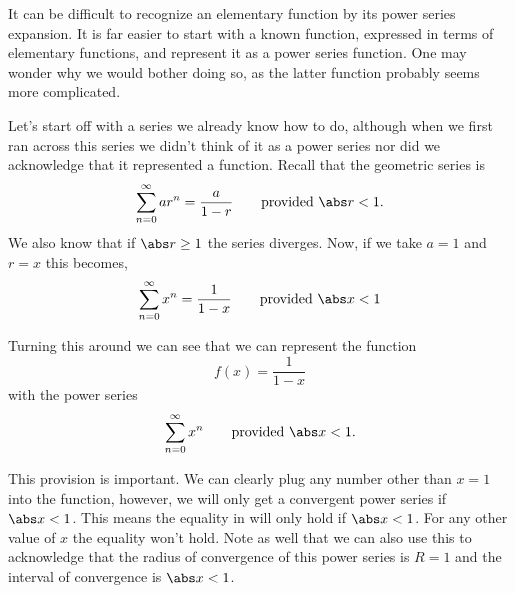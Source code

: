 It can be difficult to recognize an elementary function by its power series expansion. It is far easier to start with a known function, expressed in terms of elementary functions, and represent it as a power series function. One may wonder why we would bother doing so, as the latter function probably seems more complicated.


Let's start off with a series we already know how to do, although when we first ran across this series we didn't think of it as a power series nor did we acknowledge that it represented a function. Recall that the geometric series is
$$\sum_{n=0}^\infty ar^n = \frac a{1-r} \qquad \text{provided }\abs r<1.$$
We also know that if $\abs r\geq 1$ the series diverges. Now, if we take $a=1$ and $r=x$ this becomes,
\begin{equation}\label{eq_power_eq}
\sum_{n=0}^\infty x^n=\frac1{1-x}\qquad\text{provided }\abs x<1
\end{equation}

Turning this around we can see that we can represent the function
\begin{equation}\label{eq_power_func}
f(x) = \frac1{1-x}
\end{equation}
with the power series
\begin{equation}\label{eq_power_series}
\sum_{n=0}^{\infty}x^n \qquad \text{provided }\abs x<1.
\end{equation}

This provision is important.  We can clearly plug any number other than $x=1$ into the function, however, we will only get a convergent power series if $\abs x<1$.  This means the equality in  will only hold if $\abs x<1$.  For any other value of $x$ the equality won't hold.  Note as well that we can also use this to acknowledge that the radius of convergence of this power series is $R=1$ and the interval of convergence is $\abs x<1$.

